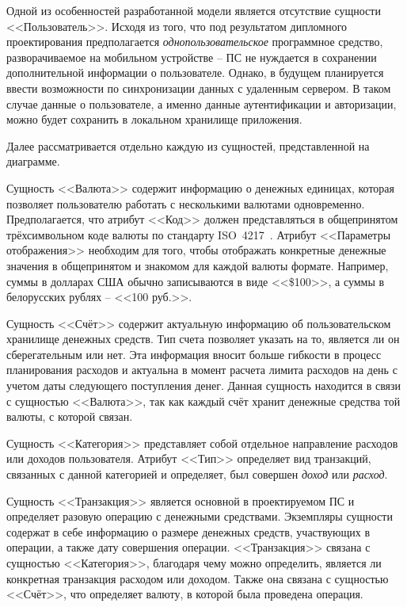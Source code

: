 Одной из особенностей разработанной модели является отсутствие сущности <<Пользователь>>.
Исходя из того, что под результатом дипломного проектирования предполагается \emph{однопользовательское} программное средство, разворачиваемое на мобильном устройстве -- ПС не нуждается в сохранении дополнительной информации о пользователе.
Однако, в будущем планируется ввести возможности по синхронизации данных с удаленным сервером.
В таком случае данные о пользователе, а именно данные аутентификации и авторизации, можно будет сохранить в локальном хранилище приложения.

Далее рассматривается отдельно каждую из сущностей, представленной на диаграмме.

Сущность <<Валюта>> содержит информацию о денежных единицах, которая позволяет пользователю работать с несколькими валютами одновременно.
Предполагается, что атрибут <<Код>> должен представляться в общепринятом трёхсимвольном коде валюты по стандарту ISO~4217~\cite{iso_4217}.
Атрибут <<Параметры отображения>> необходим для того, чтобы отображать конкретные денежные значения в общепринятом и знакомом для каждой валюты формате. Например, суммы в долларах США обычно записываются в виде <<\$100>>, а суммы в белорусских рублях -- <<100 руб.>>.

Сущность <<Счёт>> содержит актуальную информацию об пользовательском хранилище денежных средств.
Тип счета позволяет указать на то, является ли он сберегательным или нет.
Эта информация вносит больше гибкости в процесс планирования расходов и актуальна в момент расчета лимита расходов на день с учетом даты следующего поступления денег.
Данная сущность находится в связи с сущностью <<Валюта>>, так как каждый счёт хранит денежные средства той валюты, с которой связан.

Сущность <<Категория>> представляет собой отдельное направление расходов или доходов пользователя.
Атрибут <<Тип>> определяет вид транзакций, связанных с данной категорией и определяет, был совершен \emph{доход} или \emph{расход}.

Сущность <<Транзакция>> является основной в проектируемом ПС и определяет разовую операцию с денежными средствами.
Экземпляры сущности содержат в себе информацию о размере денежных средств, участвующих в операции, а также дату совершения операции.
<<Транзакция>> связана с сущностью <<Категория>>, благодаря чему можно определить, является ли конкретная транзакция расходом или доходом.
Также она связана с сущностью <<Счёт>>, что определяет валюту, в которой была проведена операция.

